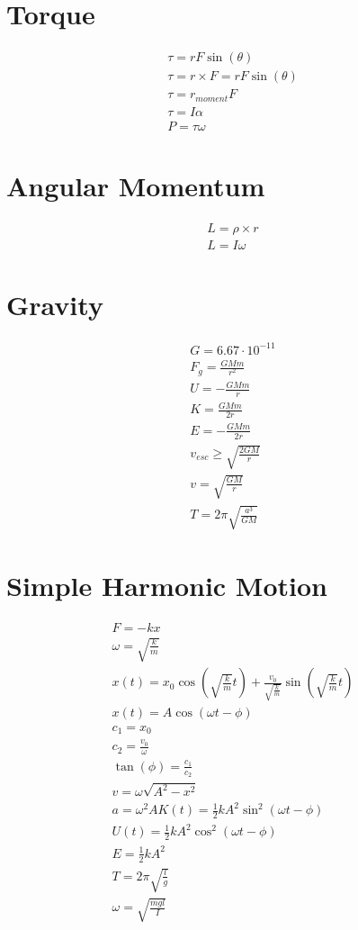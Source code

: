 \documentclass[12pt, letterpaper]{article}
\begin{document}
\section*{Torque}
\begin{align}
  \tau = rF\sin{(\theta)} \\
  \tau = r \times F = rF\sin{(\theta)} \\
  \tau = r_{moment}F \\
  \tau = I\alpha \\
  P = \tau\omega
\end{align}

\section*{Angular Momentum}
\begin{align}
  L = \rho \times r \\
  L = I\omega
\end{align}

\section*{Gravity}
\begin{align}
  G = 6.67 \cdot 10^{-11} \\
  F_g = \frac{GMm}{r^2} \\
  U = -\frac{GMm}{r} \\
  K = \frac{GMm}{2r} \\
  E = -\frac{GMm}{2r} \\
  v_{esc} \geq \sqrt{\frac{2GM}{r}} \\
  v = \sqrt{\frac{GM}{r}} \\
  T = 2\pi\sqrt{\frac{a^3}{GM}}
\end{align}

\section*{Simple Harmonic Motion}
\begin{align}
  F = -kx \\
  \omega = \sqrt{\frac{k}{m}} \\
  x(t) = x_0\cos{\left (\sqrt{\frac{k}{m}}t \right)} + \frac{v_0}{\sqrt{\frac{k}{m}}}\sin{\left( \sqrt{\frac{k}{m}}t  \right)} \\
  x(t) = A\cos{(\omega t - \phi)} \\
  c_1 = x_0 \\
  c_2 = \frac{v_0}{\omega} \\
  \tan{(\phi)} = \frac{c_1}{c_2} \\
  v = \omega \sqrt{A^2 - x^2} \\
  a = \omega^2 A
  K(t) = \frac{1}{2}kA^2\sin^2(\omega t - \phi) \\
  U(t) = \frac{1}{2}kA^2\cos^2(\omega t - \phi) \\
  E = \frac{1}{2}kA^2 \\
  T = 2\pi \sqrt{\frac{l}{g}} \\
  \omega = \sqrt{\frac{mgl}{I}}
\end{align}
\end{document}
